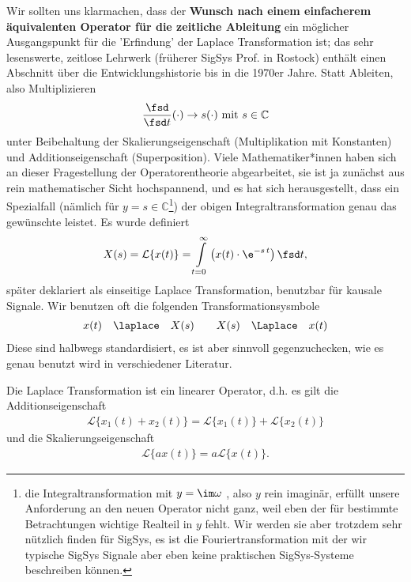 Wir sollten uns klarmachen, dass der \textbf{Wunsch nach einem einfacherem äquivalenten
Operator für die zeitliche Ableitung} ein möglicher Ausgangspunkt für die
'Erfindung' der Laplace Transformation ist; das sehr lesenswerte,
zeitlose Lehrwerk \cite{LangeSigSys1} (früherer SigSys Prof. in Rostock) enthält
einen Abschnitt über die Entwicklungshistorie bis in die 1970er Jahre.
Statt Ableiten, also Multiplizieren
\begin{equation}
  \frac{\fsd }{\fsd t} (\cdot) \rightarrow s(\cdot ) \text{ mit } s \in \mathbb{C}
\end{equation}
unter Beibehaltung der Skalierungseigenschaft (Multiplikation mit Konstanten)
und Additionseigenschaft (Superposition).
%
Viele Mathematiker*innen haben sich an dieser Fragestellung der Operatorentheorie
abgearbeitet, sie ist ja zunächst aus rein mathematischer Sicht hochspannend, und
es hat sich herausgestellt, dass ein Spezialfall
(nämlich für $y=s\in\mathbb{C}$\footnote{die Integraltransformation mit $y=\im\omega$
, also $y$ rein imaginär, erfüllt unsere Anforderung an den neuen Operator nicht ganz,
weil eben der für bestimmte Betrachtungen wichtige Realteil in $y$ fehlt.
Wir werden sie aber trotzdem sehr nützlich finden
für SigSys, es ist die Fouriertransformation mit der wir typische SigSys Signale
aber eben keine praktischen SigSys-Systeme beschreiben können.})
der obigen
Integraltransformation genau das gewünschte leistet. Es wurde definiert
\begin{align}
X(s) = \mathcal{L}\{x(t)\} = \int\limits_{t=0}^{\infty} \left(x(t) \cdot \e^{-s\,t} \right)\fsd t,
\end{align}
später deklariert als einseitige Laplace Transformation, benutzbar
für kausale Signale.
%
Wir benutzen oft die folgenden Transformationsysmbole
\begin{align}
x(t)\quad\laplace\quad X(s) \qquad X(s)\quad\Laplace\quad x(t)
\end{align}
Diese sind halbwegs standardisiert, es ist aber sinnvoll gegenzuchecken, wie es genau
benutzt wird in verschiedener Literatur.

Die Laplace Transformation ist ein linearer Operator, d.h.
es gilt die Additionseigenschaft
\begin{align}
\mathcal{L}\{x_1(t)+x_2(t)\} = \mathcal{L}\{x_1(t)\} + \mathcal{L}\{x_2(t)\}
\end{align}
und die Skalierungseigenschaft
\begin{align}
\mathcal{L}\{a x(t)\} = a \mathcal{L}\{x(t)\}.
\end{align}

